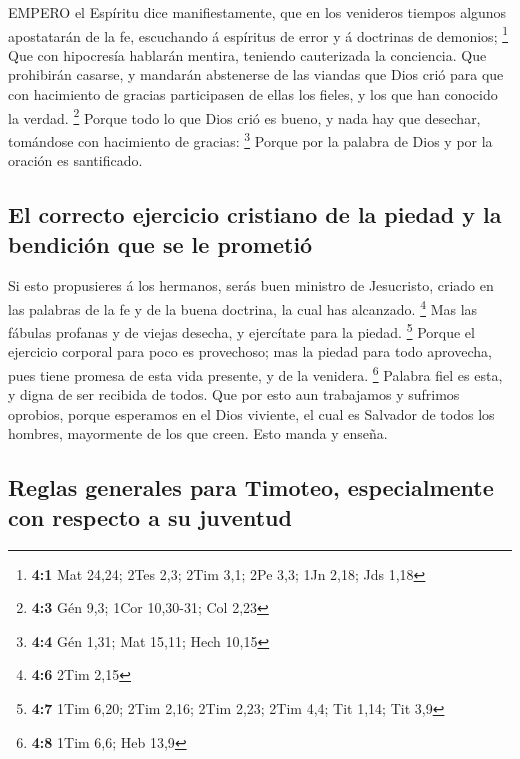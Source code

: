  EMPERO el Espíritu dice manifiestamente, que en los
venideros tiempos algunos apostatarán de la fe, escuchando á espíritus
de error y á doctrinas de demonios; \footnote{\textbf{4:1} Mat 24,24;
  2Tes 2,3; 2Tim 3,1; 2Pe 3,3; 1Jn 2,18; Jds 1,18}  Que con
hipocresía hablarán mentira, teniendo cauterizada la conciencia.
 Que prohibirán casarse, y mandarán abstenerse de las
viandas que Dios crió para que con hacimiento de gracias participasen de
ellas los fieles, y los que han conocido la verdad. \footnote{\textbf{4:3}
  Gén 9,3; 1Cor 10,30-31; Col 2,23}  Porque todo lo que Dios
crió es bueno, y nada hay que desechar, tomándose con hacimiento de
gracias: \footnote{\textbf{4:4} Gén 1,31; Mat 15,11; Hech 10,15}
 Porque por la palabra de Dios y por la oración es
santificado.

\hypertarget{el-correcto-ejercicio-cristiano-de-la-piedad-y-la-bendiciuxf3n-que-se-le-prometiuxf3}{%
\subsection{El correcto ejercicio cristiano de la piedad y la bendición
que se le
prometió}\label{el-correcto-ejercicio-cristiano-de-la-piedad-y-la-bendiciuxf3n-que-se-le-prometiuxf3}}

 Si esto propusieres á los hermanos, serás buen ministro de
Jesucristo, criado en las palabras de la fe y de la buena doctrina, la
cual has alcanzado. \footnote{\textbf{4:6} 2Tim 2,15}  Mas
las fábulas profanas y de viejas desecha, y ejercítate para la piedad.
\footnote{\textbf{4:7} 1Tim 6,20; 2Tim 2,16; 2Tim 2,23; 2Tim 4,4; Tit
  1,14; Tit 3,9}  Porque el ejercicio corporal para poco es
provechoso; mas la piedad para todo aprovecha, pues tiene promesa de
esta vida presente, y de la venidera. \footnote{\textbf{4:8} 1Tim 6,6;
  Heb 13,9}  Palabra fiel es esta, y digna de ser recibida
de todos.  Que por esto aun trabajamos y sufrimos oprobios,
porque esperamos en el Dios viviente, el cual es Salvador de todos los
hombres, mayormente de los que creen.  Esto manda y enseña.

\hypertarget{reglas-generales-para-timoteo-especialmente-con-respecto-a-su-juventud}{%
\subsection{Reglas generales para Timoteo, especialmente con respecto a
su
juventud}\label{reglas-generales-para-timoteo-especialmente-con-respecto-a-su-juventud}}

